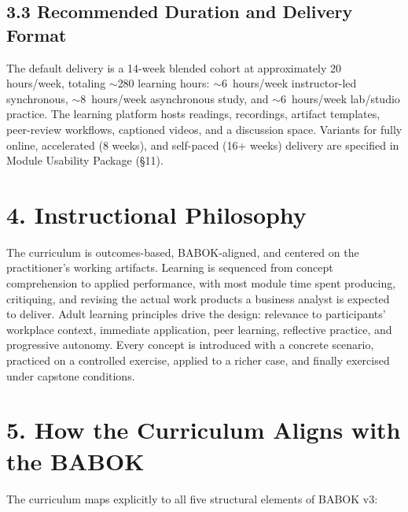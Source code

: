 \documentclass[11pt,letterpaper,oneside]{report}
\begin{document}
\subsection*{3.3 Recommended Duration and Delivery Format}
The default delivery is a 14-week blended cohort at approximately 20 hours/week, totaling ${\sim}$280 learning hours: ${\sim}$6~hours/week instructor-led synchronous, ${\sim}$8~hours/week asynchronous study, and ${\sim}$6~hours/week lab/studio practice. The learning platform hosts readings, recordings, artifact templates, peer-review workflows, captioned videos, and a discussion space. Variants for fully online, accelerated (8 weeks), and self-paced (16+ weeks) delivery are specified in Module Usability Package (\S11).

\section*{4. Instructional Philosophy}
The curriculum is outcomes-based, BABOK-aligned, and centered on the practitioner's working artifacts. Learning is sequenced from concept comprehension to applied performance, with most module time spent producing, critiquing, and revising the actual work products a business analyst is expected to deliver. Adult learning principles drive the design: relevance to participants' workplace context, immediate application, peer learning, reflective practice, and progressive autonomy. Every concept is introduced with a concrete scenario, practiced on a controlled exercise, applied to a richer case, and finally exercised under capstone conditions.

\section*{5. How the Curriculum Aligns with the BABOK}
The curriculum maps explicitly to all five structural elements of BABOK v3:
\end{document}
